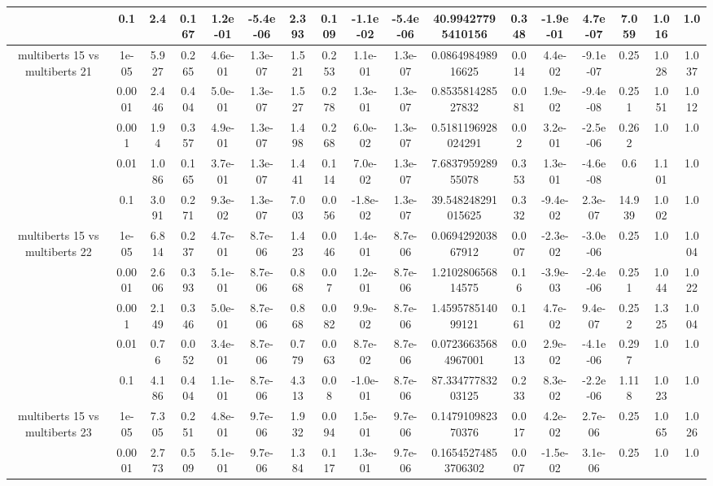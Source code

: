 \begin{tabular}{|c|c|c|c|c|c|c|c|c|c|c|c|c|c|c|c|c|}
 & 0.1 & 2.4 & 0.167 & 1.2e-01 & -5.4e-06 & 2.393 & 0.109 & -1.1e-02 & -5.4e-06 & 40.99427795410156 & 0.348 & -1.9e-01 & 4.7e-07 & 7.059 & 1.016 & 1.0 \\
\hline
\multirow{5}{*}{multiberts 15 vs multiberts 21} & 1e-05 & 5.927 & 0.265 & 4.6e-01 & 1.3e-07 & 1.521 & 0.253 & 1.1e-01 & 1.3e-07 & 0.086498498916625 & 0.014 & 4.4e-02 & -9.1e-07 & 0.25 & 1.028 & 1.037 \\
 & 0.0001 & 2.446 & 0.404 & 5.0e-01 & 1.3e-07 & 1.527 & 0.278 & 1.3e-01 & 1.3e-07 & 0.853581428527832 & 0.081 & 1.9e-02 & -9.4e-08 & 0.251 & 1.051 & 1.012 \\
 & 0.001 & 1.94 & 0.357 & 4.9e-01 & 1.3e-07 & 1.498 & 0.268 & 6.0e-02 & 1.3e-07 & 0.5181196928024291 & 0.02 & 3.2e-01 & -2.5e-06 & 0.262 & 1.0 & 1.0 \\
 & 0.01 & 1.086 & 0.165 & 3.7e-01 & 1.3e-07 & 1.441 & 0.114 & 7.0e-02 & 1.3e-07 & 7.683795928955078 & 0.353 & 1.3e-01 & -4.6e-08 & 0.6 & 1.101 & 1.0 \\
 & 0.1 & 3.091 & 0.271 & 9.3e-02 & 1.3e-07 & 7.003 & 0.056 & -1.8e-02 & 1.3e-07 & 39.548248291015625 & 0.332 & -9.4e-02 & 2.3e-07 & 14.939 & 1.002 & 1.0 \\
\hline
\multirow{5}{*}{multiberts 15 vs multiberts 22} & 1e-05 & 6.814 & 0.237 & 4.7e-01 & 8.7e-06 & 1.423 & 0.046 & 1.4e-01 & 8.7e-06 & 0.069429203867912 & 0.007 & -2.3e-02 & -3.0e-06 & 0.25 & 1.0 & 1.004 \\
 & 0.0001 & 2.606 & 0.393 & 5.1e-01 & 8.7e-06 & 0.868 & 0.07 & 1.2e-01 & 8.7e-06 & 1.210280656814575 & 0.16 & -3.9e-03 & -2.4e-06 & 0.251 & 1.044 & 1.022 \\
 & 0.001 & 2.149 & 0.346 & 5.0e-01 & 8.7e-06 & 0.868 & 0.082 & 9.9e-02 & 8.7e-06 & 1.459578514099121 & 0.161 & 4.7e-02 & 9.4e-07 & 0.252 & 1.325 & 1.004 \\
 & 0.01 & 0.76 & 0.052 & 3.4e-01 & 8.7e-06 & 0.779 & 0.063 & 8.7e-02 & 8.7e-06 & 0.07236635684967001 & 0.013 & 2.9e-02 & -4.1e-06 & 0.297 & 1.0 & 1.0 \\
 & 0.1 & 4.186 & 0.404 & 1.1e-01 & 8.7e-06 & 4.313 & 0.08 & -1.0e-01 & 8.7e-06 & 87.33477783203125 & 0.233 & 8.3e-02 & -2.2e-06 & 1.118 & 1.023 & 1.0 \\
\hline
\multirow{5}{*}{multiberts 15 vs multiberts 23} & 1e-05 & 7.305 & 0.251 & 4.8e-01 & 9.7e-06 & 1.932 & 0.094 & 1.5e-01 & 9.7e-06 & 0.147910982370376 & 0.017 & 4.2e-02 & 2.7e-06 & 0.25 & 1.065 & 1.026 \\
 & 0.0001 & 2.773 & 0.509 & 5.1e-01 & 9.7e-06 & 1.384 & 0.117 & 1.3e-01 & 9.7e-06 & 0.16545274853706302 & 0.007 & -1.5e-02 & 3.1e-06 & 0.25 & 1.0 & 1.0 \\

\end{tabular}
